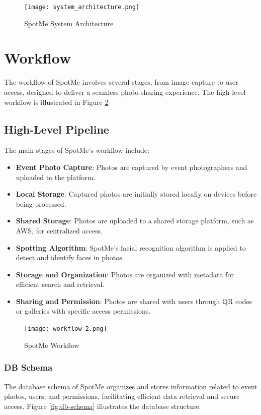 \documentclass[12pt,a4paper]{report}
\begin{document}
\begin{figure}[H]
    \centering
    \texttt{[image: system\_architecture.png]}
    \caption{SpotMe System Architecture}
    \label{fig:system-architecture}
\end{figure}


\section{Workflow}
The workflow of SpotMe involves several stages, from image capture to user access, designed to deliver a seamless photo-sharing experience. The high-level workflow is illustrated in Figure \ref{fig:workflow} 

\subsection{High-Level Pipeline}
The main stages of SpotMe’s workflow include:
\begin{itemize}
    \item \textbf{Event Photo Capture}: Photos are captured by event photographers and uploaded to the platform.
    \item \textbf{Local Storage}: Captured photos are initially stored locally on devices before being processed.
    \item \textbf{Shared Storage}: Photos are uploaded to a shared storage platform, such as AWS, for centralized access.
    \item \textbf{Spotting Algorithm}: SpotMe’s facial recognition algorithm is applied to detect and identify faces in photos.
    \item \textbf{Storage and Organization}: Photos are organized with metadata for efficient search and retrieval.
    \item \textbf{Sharing and Permission}: Photos are shared with users through QR codes or galleries with specific access permissions.
\end{itemize}

\begin{figure}[H]
    \centering
    \hspace{-8cm} %
    
    \texttt{[image: workflow 2.png]}
    \caption{SpotMe Workflow}
    \label{fig:workflow}
\end{figure}

\subsubsection{DB Schema}
The database schema of SpotMe organizes and stores information related to event photos, users, and permissions, facilitating efficient data retrieval and secure access. Figure \ref{fig:db-schema} illustrates the database structure.
\end{document}

